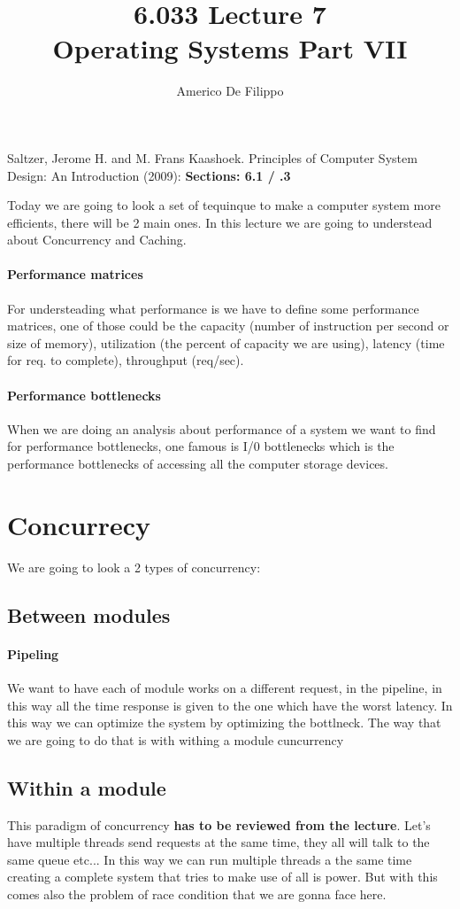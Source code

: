 \documentclass{article}
\title{6.033 Lecture 7 \\ Operating Systems Part VII}
\author{Americo De Filippo}
\begin{document}
 
  \maketitle
    \begin{thebibliography}{9}
    Saltzer, Jerome H. and M. Frans Kaashoek. Principles of Computer System Design: An Introduction (2009): \textbf{Sections: 6.1 / .3}
  \end{thebibliography}
  Today we are going to look a set of tequinque to make a computer system more efficients, 
  there will be 2 main ones. In this lecture we are going to understead about Concurrency and 
  Caching. 
  \paragraph{Performance matrices} For understeading what performance is we have to define some
    performance matrices, one of those could be the capacity (number of instruction per second or
    size of memory), utilization (the percent of capacity we are using), 
    latency (time for req. to complete), throughput (req/sec).
  \paragraph{Performance bottlenecks} When we are doing an analysis about performance of a system 
    we want to find for performance bottlenecks, one famous is I/0 bottlenecks which is the 
    performance bottlenecks of accessing all the computer storage devices.
  \section{Concurrecy}
    We are going to look a 2 types of concurrency:
    \subsection{Between modules}
      \paragraph{Pipeling} We want to have each of module works on a different request, in the
        pipeline, in this way all the time response is given to the one which have the worst 
        latency. In this way we can optimize the system by optimizing the bottlneck.
      The way that we are going to do that is with withing a module cuncurrency
    \subsection{Within a module}
      This paradigm of concurrency \textbf{has to be reviewed from the lecture}.
      Let's have multiple threads send requests at the same time, they all will talk to the
      same queue etc... In this way we can run multiple threads a the same time creating 
      a complete system that tries to make use of all is power. But with this comes also the
      problem of race condition that we are gonna face here.
\end{document}
